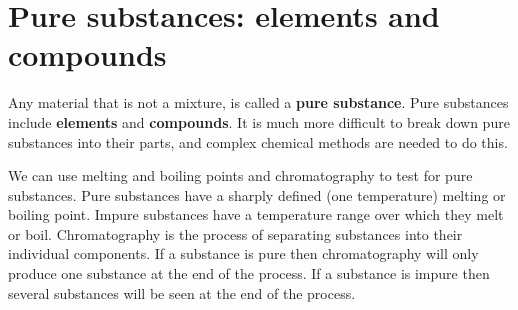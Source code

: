             \section{Pure substances: elements and compounds}
            \nopagebreak
      \label{m38708*id63273}Any material that is not a mixture, is called a \textbf{pure substance}. Pure substances include \textbf{elements} and \textbf{compounds}. It is much more difficult to break down pure substances into their parts, and complex chemical methods are needed to do this.\par 
      \label{m38708*eip-862}We can use melting and boiling points and chromatography to test for pure substances. Pure substances have a sharply defined (one temperature) melting or boiling point. Impure substances have a temperature range over which they melt or boil.  Chromatography is the process of separating substances into their individual components. If a substance is pure then chromatography will only produce one substance at the end of the process. If a substance is impure then several substances will be seen at the end of the process. \par \label{m38708*eip-122}
